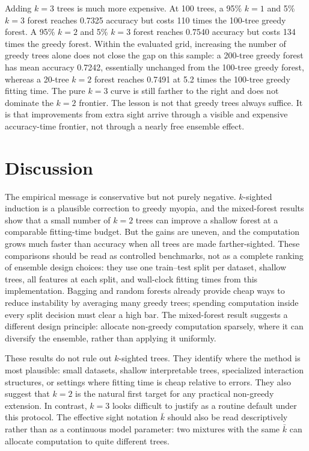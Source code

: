 \documentclass[final,5p,times]{elsarticle}
\begin{document}
Adding $k=3$ trees is much more expensive. At 100 trees, a 95\% $k=1$ and 5\% $k=3$ forest reaches 0.7325 accuracy but costs 110 times the 100-tree greedy forest. A 95\% $k=2$ and 5\% $k=3$ forest reaches 0.7540 accuracy but costs 134 times the greedy forest. Within the evaluated grid, increasing the number of greedy trees alone does not close the gap on this sample: a 200-tree greedy forest has mean accuracy 0.7242, essentially unchanged from the 100-tree greedy forest, whereas a 20-tree $k=2$ forest reaches 0.7491 at 5.2 times the 100-tree greedy fitting time. The pure $k=3$ curve is still farther to the right and does not dominate the $k=2$ frontier. The lesson is not that greedy trees always suffice. It is that improvements from extra sight arrive through a visible and expensive accuracy-time frontier, not through a nearly free ensemble effect.

\section{Discussion}

The empirical message is conservative but not purely negative. $k$-sighted induction is a plausible correction to greedy myopia, and the mixed-forest results show that a small number of $k=2$ trees can improve a shallow forest at a comparable fitting-time budget. But the gains are uneven, and the computation grows much faster than accuracy when all trees are made farther-sighted. These comparisons should be read as controlled benchmarks, not as a complete ranking of ensemble design choices: they use one train--test split per dataset, shallow trees, all features at each split, and wall-clock fitting times from this implementation. Bagging and random forests already provide cheap ways to reduce instability by averaging many greedy trees; spending computation inside every split decision must clear a high bar. The mixed-forest result suggests a different design principle: allocate non-greedy computation sparsely, where it can diversify the ensemble, rather than applying it uniformly.

These results do not rule out $k$-sighted trees. They identify where the method is most plausible: small datasets, shallow interpretable trees, specialized interaction structures, or settings where fitting time is cheap relative to errors. They also suggest that $k=2$ is the natural first target for any practical non-greedy extension. In contrast, $k=3$ looks difficult to justify as a routine default under this protocol. The effective sight notation $\bar{k}$ should also be read descriptively rather than as a continuous model parameter: two mixtures with the same $\bar{k}$ can allocate computation to quite different trees.
\end{document}
